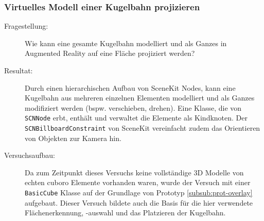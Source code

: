 \subsubsection{Virtuelles Modell einer Kugelbahn projizieren}\label{subsub:prot-kugelbahn}
\begin{description}
	\item[Fragestellung:] Wie kann eine gesamte Kugelbahn modelliert und als Ganzes in Augmented Reality auf eine Fläche projiziert werden?
	\item[Resultat:] Durch einen hierarchischen Aufbau von SceneKit Nodes, kann eine Kugelbahn aus mehreren einzelnen Elementen modelliert und als Ganzes modifiziert werden (bspw. verschieben, drehen). Eine Klasse, die von \texttt{SCNNode} erbt, enthält und verwaltet die Elemente als Kindknoten. Der \texttt{SCNBillboardConstraint} von SceneKit vereinfacht zudem das Orientieren von Objekten zur Kamera hin. %
	\item[Versuchsaufbau:] Da zum Zeitpunkt dieses Versuchs keine vollständige 3D Modelle von echten cuboro Elemente vorhanden waren, wurde der Versuch mit einer \texttt{BasicCube} Klasse auf der Grundlage von Prototyp \ref{subsub:prot-overlay} aufgebaut. Dieser Versuch bildete auch die Basis für die hier verwendete Flächenerkennung, -auswahl und das Platzieren der Kugelbahn.


\end{description}
